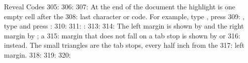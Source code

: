 \begin{Feature}{Reveal Codes}
305: 
306: 
307: At the end of the document the highlight is one empty cell after the
308: last character or code.  For example, type , press
309: , type  and press :
310: 
311: : 
313: 
314: The left margin is shown by \Scr{\{} and the right margin by \Scr{\}}; a
315: margin that does not fall on a tab stop is shown by \Scr{[} or \Scr{]}
316: instead.  The small triangles are the tab stops, every half inch from the
317: left margin.
318: 
319: 
320: \end{Feature}
